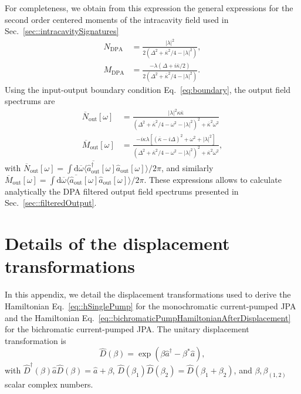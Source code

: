 \documentclass[pra,twocolumn,superscriptaddress]{revtex4-1}
\newcommand{\ah}[0]{\hat{a}}
\newcommand{\kappaTot}[0]{\overline{\kappa}}
\newcommand{\aout}[0]{\hat{a}_{\mathrm{out}}}
\newcommand{\parS}[1]{\left[#1\right]}
\newcommand{\parO}[1]{\left(#1\right)}
\newcommand{\abs}[1]{\left|#1\right|}
\newcommand{\drm}[0]{\mathrm{d}}
\begin{document}
For completeness, we obtain from this expression the general expressions for the second order centered moments of the intracavity field used in Sec.~\ref{sec::intracavitySignatures}
\begin{align}
	N_{\mathrm{DPA}} &= 
	\frac{\abs{\lambda}^2}{2 \parO{\Delta^2 + \kappaTot^2/4- \abs{\lambda}^2}},
	\\
	M_{\mathrm{DPA}} &=
	\frac{- \lambda \parO{\Delta + i \kappaTot/2}}{2 \parO{\Delta^2 + \kappaTot^2/4- \abs{\lambda}^2}}
	.
\end{align}
Using the input-output boundary condition Eq.~\eqref{eq:boundary}, the output field spectrums are~\cite{Collett:1984kl}
\begin{align}
 	\overline{N}_{\mathrm{out}}[\omega] 
 	&=
 	\frac{\abs{\lambda}^2 \kappa \kappaTot}{ \parO{\Delta^2 + \kappaTot^2/4-\omega^2-\abs{\lambda}^2 }^2 + \kappaTot^2 \omega^2}
 	\label{eq:N_out}
 	\\
 	\overline{M}_{\mathrm{out}}[\omega] 
 	&=
 	\frac{
 		-i \kappa \lambda \parS{\parO{\kappaTot-i \Delta}^2+\omega^2+ \abs{\lambda}^2}
 	}{ \parO{\Delta^2 + \kappaTot^2/4-\omega^2-\abs{\lambda}^2 }^2 + \kappaTot^2 \omega^2}
 	,
 	\label{eq:M_out}
\end{align} 
with $\overline{N}_{\mathrm{out}}[\omega]  = \int \drm \overline{\omega}  \langle  
\overline{\aout^\dag}[\omega] \aout [\omega]
\rangle/2 \pi$, and similarly 
$\overline{M}_{\mathrm{out}}[\omega]  = \int \drm \overline{\omega}  \langle  
\overline{\aout}[\omega] \aout [\omega]
\rangle/2 \pi$. These expressions allows to calculate analytically the DPA filtered output field spectrums presented in Sec.~\ref{sec::filteredOutput}.


\section{Details of the displacement transformations}\label{app::doubleDisplacement}
In this appendix, we detail the displacement transformations used to derive 
the Hamiltonian Eq.~\eqref{eq::hSinglePump} for the monochromatic current-pumped JPA and the Hamiltonian Eq.~\eqref{eq::bichromaticPumpHamiltonianAfterDisplacement} for the bichromatic current-pumped JPA.
% 
The unitary displacement transformation is~\cite{Walls:2008fk}
\begin{equation}
\hat D (\beta) = \exp \parO{ \beta \ah^\dag - \beta^* \ah},
\end{equation}
with $\hat D^\dag(\beta) \ah \hat D(\beta) = \ah +\beta$, $\hat D(\beta_1) \hat D(\beta_2) = \hat D(\beta_1+ \beta_2)$, and $\beta, \beta_{(1,2)}$ scalar complex numbers.
\end{document}
